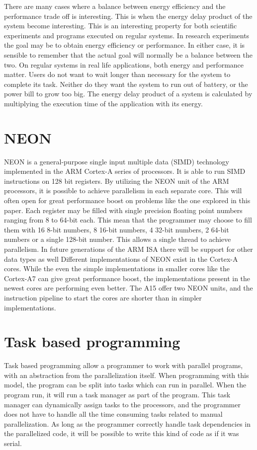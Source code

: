 There are many cases where a balance between energy efficiency and the performance trade off is interesting.
This is when the energy delay product of the system become interesting.
This is an interesting property for both scientific experiments and programs executed on regular systems.
In research experiments the goal may be to obtain energy efficiency or performance.
In either case, it is sensible to remember that the actual goal will normally be a balance between the two.
On regular systems in real life applications, both energy and performance matter.
Users do not want to wait longer than necessary for the system to complete its task.
Neither do they want the system to run out of battery, or the power bill to grow too big.
The energy delay product of a system is calculated by multiplying the execution time of the application with its energy.

\section{NEON}
NEON is a general-purpose single input multiple data (SIMD) technology implemented in the ARM Cortex-A series of processors.
It is able to run SIMD instructions on 128 bit registers.
By utilizing the NEON unit of the ARM processors, it is possible to achieve parallelism in each separate core.
This will often open for great performance boost on problems like the one explored in this paper.
Each register may be filled with single precision floating point numbers ranging from 8 to 64-bit each.
This mean that the programmer may choose to fill them with 16 8-bit numbers, 8 16-bit numbers, 4 32-bit numbers, 2 64-bit numbers or a single 128-bit number.
This allows a single thread to achieve parallelism.
In future generations of the ARM ISA there will be support for other data types as well %
Different implementations of NEON exist in the Cortex-A cores.
While the even the simple implementations in smaller cores like the Cortex-A7 can give great performance boost, the implementations present in the newest cores are performing even better.
The A15 offer two NEON units, and the instruction pipeline to start the cores are shorter than in simpler implementations.

\section{Task based programming}
Task based programming allow a programmer to work with parallel programs, with an abstraction from the parallelization itself.
When programming with this model, the program can be split into tasks which can run in parallel.
When the program run, it will run a task manager as part of the program.
This task manager can dynamically assign tasks to the processors, and the programmer does not have to handle all the time consuming tasks related to manual parallelization.
As long as the programmer correctly handle task dependencies in the parallelized code, it will be possible to write this kind of code as if it was serial.

